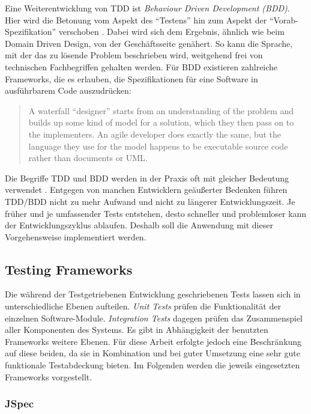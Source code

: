 Eine Weiterentwicklung von TDD ist \textit{Behaviour Driven Development (BDD)}. Hier wird die Betonung vom Aspekt des \enquote{Testens} hin zum Aspekt der \enquote{Vorab-Spezifikation} verschoben . Dabei wird sich dem Ergebnis, ähnlich wie beim Domain Driven Design, von der Geschäftsseite genähert. So kann die Sprache, mit der das zu lösende Problem beschrieben wird, weitgehend frei von technischen Fachbegriffen gehalten werden. Für BDD existieren zahlreiche Frameworks, die es erlauben, die Spezifikationen für eine Software in ausführbarem Code auszudrücken:

\begin{quote}
A waterfall \enquote{designer} starts from an understanding of the problem and builds up some kind of model for a solution, which they then pass on to the implementers. An agile developer does exactly the same, but the language they use for the model happens to be executable source code rather than documents or UML. 
\end{quote}

Die Begriffe TDD und BDD werden in der Praxis oft mit gleicher Bedeutung verwendet \cite{bdd:tdd}. Entgegen von manchen Entwicklern geäußerter Bedenken führen TDD/BDD nicht zu mehr Aufwand und nicht zu längerer Entwicklungszeit. Je früher und je umfassender Tests entstehen, desto schneller und problemloser kann der Entwicklungszyklus ablaufen. Deshalb soll die Anwendung mit dieser Vorgehensweise implementiert werden.


\subsection{Testing Frameworks}
\label{subsec:testframe}

Die während der Testgetriebenen Entwicklung geschriebenen Tests lassen sich in unterschiedliche Ebenen aufteilen. \textit{Unit Tests} prüfen die Funktionalität der einzelnen Software-Module. \textit{Integration Tests} dagegen prüfen das Zusammenspiel aller Komponenten des Systems. Es gibt in Abhängigkeit der benutzten Frameworks weitere Ebenen. Für diese Arbeit erfolgte jedoch eine Beschränkung auf diese beiden, da sie in Kombination und bei guter Umsetzung eine sehr gute funktionale Testabdeckung bieten. Im Folgenden werden die jeweils eingesetzten Frameworks vorgestellt. 


\subsubsection{JSpec}
\label{subsec:jspec}


